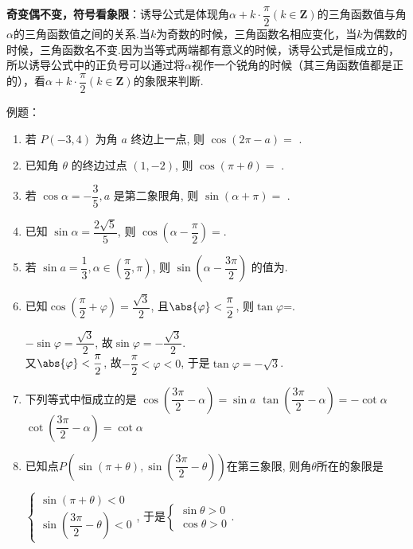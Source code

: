 \textbf{奇变偶不变，符号看象限}：诱导公式是体现角$\alpha+k \cdot \dfrac{\pi}{2}(k \in \mathbf{Z})$的三角函数值与角$\alpha$的三角函数值之间的关系.当$k$为奇数的时候，三角函数名相应变化，当$k$为偶数的时候，三角函数名不变.因为当等式两端都有意义的时候，诱导公式是恒成立的，所以诱导公式中的正负号可以通过将$\alpha$视作一个锐角的时候（其三角函数值都是正的），看$\alpha+k \cdot \dfrac{\pi}{2}(k \in \mathbf{Z})$的象限来判断.

例题：
\begin{enumerate}
    \item 若 $P\left(-3,4\right)$ 为角 $a$ 终边上一点, 则 $\cos \left(2 \pi-a\right)=$ .
    \item 已知角 $\theta$ 的终边过点 $\left(1,-2\right)$, 则 $\cos \left(\pi+\theta\right)=$ .
    \item 若 $\cos \alpha=-\dfrac{3}{5}, a$ 是第二象限角, 则 $\sin \left(\alpha+\pi\right)=$ .
    
    \item 已知 $\sin \alpha=\dfrac{2 \sqrt{5}}{5}$, 则 $\cos \left(\alpha-\dfrac{\pi}{2}\right)=$.

    \item 若 $\sin a=\dfrac{1}{3}, \alpha\in\left(\dfrac{\pi}{2}, \pi\right)$, 则 $\sin \left(\alpha-\dfrac{3 \pi}{2}\right)$ 的值为.

    \item 已知$\cos\left(\dfrac{\pi}{2}+\varphi\right)=\dfrac{\sqrt3}{2}$, 且$\abs{\varphi}<\dfrac{\pi}{2}$, 则$\tan\varphi$=. 
    \begin{jieda}
    $-\sin\varphi=\dfrac{\sqrt{3}}{2}$, 故$\sin\varphi=-\dfrac{\sqrt{3}}{2}$. \\
    又$\abs{\varphi}<\dfrac{\pi}{2}$, 故$-\dfrac{\pi}{2}<\varphi<0$, 于是$\tan\varphi=-\sqrt{3}$. 
    \end{jieda}

    \item 下列等式中恒成立的是
    {$\cos \left(\dfrac{3 \pi}{2}-\alpha\right)=\sin a$}
    {$\tan \left(\dfrac{3 \pi}{2}-\alpha\right)=-\cot \alpha$}
    {$\cot \left(\dfrac{3 \pi}{2}-\alpha\right)=\cot \alpha$}

    \item 已知点$P\left(\sin\left(\pi+\theta\right),\sin\left(\dfrac{3\pi}{2}-\theta\right)\right)$在第三象限, 则角$\theta$所在的象限是
    \begin{jieda}
    $\begin{cases}
    \sin\left(\pi+\theta\right)<0\\
    \sin\left(\dfrac{3\pi}{2}-\theta\right)<0
    \end{cases}$, 
    于是$\begin{cases}
    \sin\theta>0\\
    \cos\theta>0
    \end{cases}$. 
    \end{jieda}


\end{enumerate}

